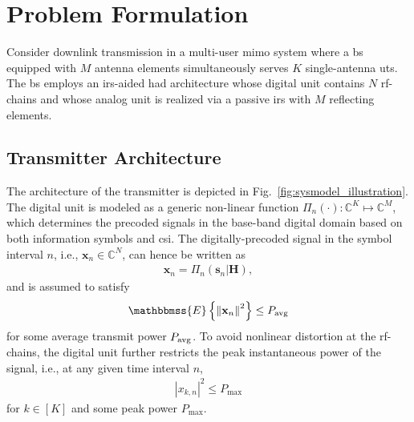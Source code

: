 \documentclass[12pt,draftclsnofoot,onecolumn,journal]{IEEEtran}
\newcommand{\brc}[1]{ \left( #1 \right) }
\newcommand{\dbc}[1]{ \left[ #1 \right] }
\newcommand{\Ex}[1]{ \mathbbmss{E}\left\lbrace #1 \right\rbrace }
\newcommand{\norm}[1]{ \left\Vert #1 \right\Vert}
\newcommand{\abs}[1]{ \left\vert #1 \right\vert}
\begin{document}
\section{Problem Formulation}
Consider downlink transmission in a multi-user \ac{mimo} system where a \ac{bs} equipped with $M$ antenna elements simultaneously serves $K$ single-antenna \acp{ut}. The \ac{bs} employs an \ac{irs}-aided \ac{had} architecture whose digital unit contains $N$ \ac{rf}-chains and whose analog unit is realized via a passive \ac{irs} with $M$ reflecting elements.%

%

\subsection{Transmitter Architecture}
The architecture of the transmitter is depicted in Fig.~\ref{fig:sysmodel_illustration}. The digital unit is modeled as a generic non-linear function $\Pi_n\brc{\cdot}: \mathbb C^{K} \mapsto \mathbb C^{M}$, which determines the precoded signals in the base-band digital domain based on both information symbols and \ac{csi}. The digitally-precoded signal in the symbol interval $n$, i.e., $\mathbf{x}_n \in \mathbb{C}^N$, can hence be written as 
\begin{align}
\mathbf x_n = \Pi_n\brc{ \mathbf s_n  \vert \mathbf H},
\end{align}
and is assumed to satisfy 
\begin{align}
	\Ex{ \norm{\mathbf x_n}^2 } \leq P_{\rm avg}
\end{align}
for some average transmit power $P_{\rm avg}$. To avoid nonlinear distortion at the \ac{rf}-chains, the digital unit further restricts the peak instantaneous power of the signal, i.e., at any given time interval $n$,
\begin{align}
\abs{x_{k,n}}^2 \leq P_{\max}
\end{align}
for $k\in\dbc{K}$ and some peak power $P_{\max}$.
\end{document}
